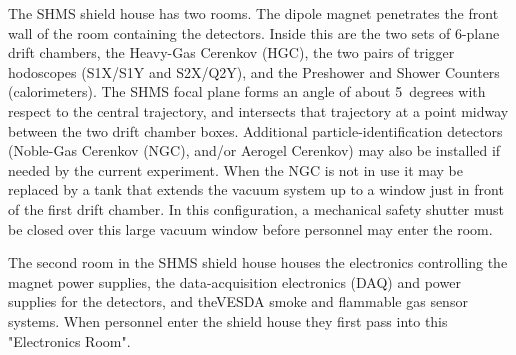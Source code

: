 {The SHMS shield house has two rooms. The dipole magnet penetrates the front
wall of the room containing the detectors. Inside this are the two sets of 6-plane
drift chambers, the Heavy-Gas Cerenkov (HGC), the two pairs of trigger hodoscopes 
(S1X/S1Y and S2X/Q2Y), and
the Preshower and Shower Counters (calorimeters). The SHMS focal plane forms an 
angle of about 5~degrees with respect to the central trajectory, 
and intersects that trajectory at
a point midway between the two drift chamber boxes. Additional  particle-identification
detectors (Noble-Gas Cerenkov (NGC), and/or Aerogel Cerenkov) may also be 
installed if needed by the current experiment. When the NGC is not in use it may
be replaced by a tank that extends the vacuum system up  to a window just in
front of the first drift chamber. In this configuration, a mechanical safety shutter
must be closed over this large vacuum window before personnel may enter the
room.

The second room in the SHMS shield house houses the
electronics controlling the magnet power supplies, the data-acquisition 
electronics (DAQ) and power supplies for the detectors, and theVESDA
smoke and flammable gas sensor systems. When personnel enter the shield
house they first pass into this "Electronics Room". 
}

